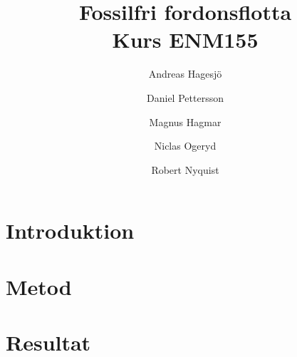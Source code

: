 \documentclass[a4paper,11pt,fleqn, titlepage]{article}
\author{Andreas Hagesjö \and Daniel Pettersson \and
Magnus Hagmar \and Niclas Ogeryd \and Robert Nyquist}
\title{Fossilfri fordonsflotta \\ Kurs ENM155}
\begin{document}
\maketitle

\section{Introduktion}



\section{Metod}
\section{Resultat}
\end{document}
